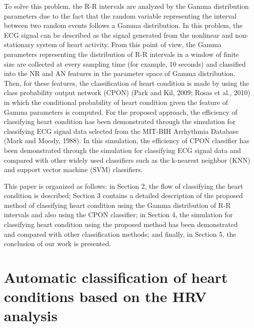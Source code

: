 \documentclass[times,twocolumn,final,authoryear]{elsarticle}
\begin{document}
To solve this problem, the R-R intervals are analyzed  by the Gamma distribution parameters due to the fact that the random variable representing the interval between two random events follows a Gamma distribution. In this problem, the ECG signal can be described as the signal generated from the nonlinear and non-stationary system of heart activity. From this point of view, the Gamma parameters representing the distribution of R-R intervals in
a window of finite size are collected at every sampling time (for example, 10 seconds) and classified into the NR and AN features in the parameter space of Gamma distribution. Then, for these features, the classification of heart condition is made by using the class probability output network (CPON) 
(Park and Kil, 2009; Rosas et al., 2010) in which the conditional probability of heart condition given the feature of Gamma parameters is computed. For the proposed approach, the efficiency of classifying heart condition has been demonstrated through the simulation for classifying ECG signal data selected from 
the MIT-BIH Arrhythmia Database (Mark and Moody, 1988). In this simulation, the efficiency of CPON classifier has been demonstrated through the simulation for classifying ECG signal data and compared with other widely used classifiers such as the k-nearest neighbor (KNN) and support vector machine (SVM) classifiers.


This paper is organized as follows: in Section 2, the flow of classifying the heart condition is described; Section 3 contains a detailed description of the proposed method of classifying heart condition using the Gamma distribution of R-R intervals and also using the CPON classifier; in Section 4, the simulation for classifying heart condition using the proposed method has been demonstrated and compared with other classification methods; and finally, in Section 5, the conclusion of our work is presented.


\section{Automatic classification of heart conditions based on the HRV analysis}
\end{document}
